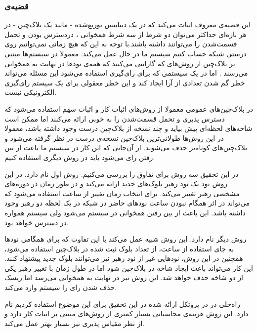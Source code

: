 \subsubsection{قضیه‌ی }
این قضیه‌ی معروف 
\cite{CAP}
اثبات می‌کند که در یک دیتابیس توزیع‌شده - مانند یک بلاک‌چین - در هر بازه‌ای حداکثر می‌توان دو شرط از سه شرط همخوانی 
، دردسترس بودن 
و تحمل قسمت‌شدن
را می‌توانند داشته باشند.با توجه به این که هیچ زمانی نمی‌توانیم روی درستی شبکه حساب کنیم سیستم‌ ما در حال  عمل می‌کند. معمولا در سیستم‌ها مبتنی بر بلاک‌چین از روش‌های  که گارانتی می‌کنند که همه‌ی نودها در نهایت به همخوانی می‌رسند
.
اما در یک سیستمی که برای رای‌گیری استفاده می‌شود این مسئله می‌تواند خطر گم شدن تعدادی از آرا ایجاد کند و این خطر معقولی برای یک‌ سیستم‌ رای‌گیری الکترونیکی نیست.
\par
در بلاک‌چین‌های عمومی معمولا از روش‌های اثبات کار و اثبات‌ سهم استفاده می‌شود که دسترس پذیری و تحمل قسمت‌شدن را به خوبی ارائه می‌کنند اما ممکن است شاخه‌های
لحظه‌ای پیش بیاید و چند نسخه از بلاک‌چین درست وجود داشته باشد، معمولا در این روش‌ها طولانی‌ترین بلاک‌چین نسخه‌ی درست در نظر گرفته می‌شود و بلاک‌چین‌های کوتاه‌تر حذف می‌شوند. از آن‌جایی که این کار در سیستم ما باعث از بین رفتن رای‌ می‌شود باید در روش دیگری استفاده کنیم.
\par
در این تحقیق سه روش برای تفاوق را بررسی می‌کنیم. روش اول 
\cite{Aura}
 نام دارد. در این روش نود یک نود رهبر بلوک‌های جدید ارائه می‌کند و در طور زمان در دوره‌های مشخصی رهبر تغییر می‌کند. برای انتخاب زمان تغییر از ساعت  استفاده می‌شود که می‌تواند در اثر همگام
 نبودن ساعت نود‌های حاضر در شبکه در یک لحظه دو رهبر وجود داشته باشد. این باعث از بین رفتن همخوانی در سیستم می‌شود ولی سیستم همواره در دسترس خواهد بود. 
\par
روش دیگر  
\cite{Clique}
نام دارد. این روش شبیه  عمل می‌کند با این تفاوت که برای همگامی نودها به جای استفاده از ساعت، از تعداد بلوک ثبت شده در بلاک‌چین استفاده می‌شود، همچنین در این روش، نود‌هایی غیر از نود رهبر نیز می‌توانند بلوک جدید پیشنهاد کنند. این کار می‌تواند باعث ایجاد شاخه‌ در بلاک‌چین شود اما در طول زمان با تغییر رهبر یکی از دو شاخه حذف خواهد شد. این روش نیز در نهایت به همخوانی می‌رسد اما ریسک حذف شدن رای را سیستم وارد می‌کند.
\par

راه‌حلی در در پروتکل ارائه شده در این تحقیق برای این موضوع استفاده کردیم
\cite{PBFT}
نام دارد. این روش هزینه‌ی محاسباتی بسیار کمتری از روش‌های مبتنی بر اثبات کار دارد و از نظر مقیاس پذیری
\cite{PBFperf}
نیز بسیار بهتر عمل می‌کند.

